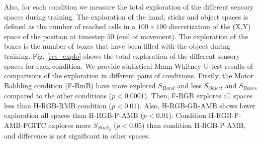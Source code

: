 \documentclass[10pt,letterpaper]{article}
\begin{document}

	Also, for each condition we measure the total exploration of the different sensory spaces during training. 
	The exploration of the hand, sticks and object spaces is defined as the number of reached cells 
	in a $100\times100$ discretization of the (X,Y) space of the position at timestep $50$ (end of movement).
	The exploration of the boxes is the number of boxes that have been filled with the object during training.
	Fig. \ref{res_explo} shows the total exploration of the different sensory spaces for each condition.
	We provide statistical Mann-Whitney U test results of comparisons of the exploration in different pairs of conditions.
	Firstly, the Motor Babbling condition (F-RmB) have more explored $S_{Hand}$ and less $S_{Object}$ and $S_{Boxes}$ compared to the other conditions ($p<0.0001$).
	Then, F-RGB explores all spaces less than H-RGB-RMB condition ($p<0.01$).
	Also, H-RGB-GR-AMB shows lower exploration all spaces than H-RGB-P-AMB ($p<0.01$).
	Condition H-RGB-P-AMB-PGITC explores more $S_{Stick_2}$ ($p<0.05$) than condition H-RGB-P-AMB, and difference is not significant in other spaces.
	
\end{document}
